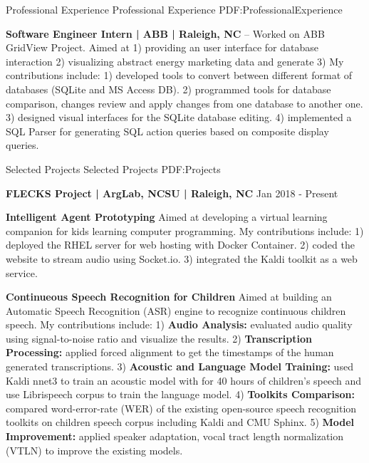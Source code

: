 \documentclass[letterpaper,MMMyyyy,nonstopmode]{simpleresumecv}
\begin{document}
\begin{Body}
    \Section
    {Professional Experience}
    {Professional Experience}
    {PDF:ProfessionalExperience}
    
    \Entry
    {\textbf{Software Engineer Intern | ABB | Raleigh, NC}}
    \hfill
     --
    \BulletItem
    Worked on ABB GridView Project. 
    Aimed at 1) providing an user interface for database interaction
    2) visualizing abstract energy marketing data and generate 3) 
    \BulletItem
    My contributions include: 
    1) developed tools to convert between different format of databases (SQLite and MS Access DB). 
    2) programmed tools for database comparison, changes review and apply changes from one database to another one.
    3) designed visual interfaces for the SQLite database editing. 
    4) implemented a SQL Parser for generating SQL action queries based on composite display queries.
    
    \Section
    {Selected Projects}
    {Selected Projects}
    {PDF:Projects}
    
    \Entry
    \textbf{FLECKS Project | ArgLab, NCSU | Raleigh, NC} \hfill Jan 2018 - Present
    \begin{Detail}
        \Entry
        \textbf{Intelligent Agent Prototyping}
        \BulletItem
        Aimed at developing a virtual learning companion for kids learning computer programming.
        \BulletItem
        My contributions include: 
        1) deployed the RHEL server for web hosting with Docker Container.
        2) coded the website to stream audio using Socket.io.
        3) integrated the Kaldi toolkit as a web service.
        
        \Entry
        \textbf{Continueous Speech Recognition for Children}
        \BulletItem
        Aimed at building an Automatic Speech Recognition (ASR) engine to recognize continuous children speech.
        \BulletItem
        My contributions include: 
        1) \textbf{Audio Analysis:} evaluated audio quality using signal-to-noise ratio and visualize the results.
        2) \textbf{Transcription Processing:} applied forced alignment to get the timestamps of the human generated transcriptions.
        3) \textbf{Acoustic and Language Model Training:} used Kaldi nnet3 to train an acoustic model with for 40 hours of children's speech and use Librispeech corpus to train the language model.
        4) \textbf{Toolkits Comparison:} compared word-error-rate (WER) of the existing open-source speech recognition toolkits on children speech corpus including Kaldi and CMU Sphinx.
        5) \textbf{Model Improvement:} applied speaker adaptation, vocal tract length normalization (VTLN) to improve the existing models.
    \end{Detail}
    

\end{Body}
\end{document}
